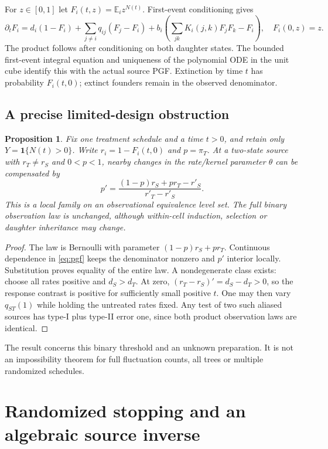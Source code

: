 \documentclass[11pt]{article}
\newtheorem{proposition}[theorem]{Proposition}
\theoremstyle{definition}
\newcommand{\E}{\mathbb E}
\begin{document}
For $z\in[0,1]$ let $F_i(t,z)=\E_i z^{N(t)}$. First-event conditioning gives
\begin{equation}\label{eq:pgf}
 \partial_tF_i=d_i(1-F_i)+\sum_{j\ne i}q_{ij}(F_j-F_i)
       +b_i\left(\sum_{jk}K_i(j,k)F_jF_k-F_i\right),\quad F_i(0,z)=z.
\end{equation}
The product follows after conditioning on both daughter states. The bounded
first-event integral equation and uniqueness of the polynomial ODE in the unit
cube identify this with the actual source PGF. Extinction by time $t$ has
probability $F_i(t,0)$; extinct founders remain in the observed denominator.

\subsection{A precise limited-design obstruction}
\begin{proposition}\label{prop:alias}
Fix one treatment schedule and a time $t>0$, and retain only
$Y=\mathbf1\{N(t)>0\}$. Write $r_i=1-F_i(t,0)$ and $p=\pi_T$. At a two-state
source with $r_T\ne r_S$ and $0<p<1$, nearby changes in the rate/kernel
parameter $\theta$ can be compensated by
\begin{equation}\label{eq:alias}
 p'=\frac{(1-p)r_S+pr_T-r'_S}{r'_T-r'_S}.
\end{equation}
This is a local family on an observational equivalence level set. The full
binary observation law is unchanged, although within-cell induction, selection
or daughter inheritance may change.
\end{proposition}
\begin{proof}
The law is Bernoulli with parameter $(1-p)r_S+pr_T$. Continuous dependence in
\eqref{eq:pgf} keeps the denominator nonzero and $p'$ interior locally.
Substitution proves equality of the entire law. A nondegenerate class exists:
choose all rates positive and $d_S>d_T$. At zero, $(r_T-r_S)'=d_S-d_T>0$, so the
response contrast is positive for sufficiently small positive $t$. One may then
vary $q_{ST}(1)$ while holding the untreated rates fixed. Any test of two such
aliased sources has type-I plus type-II error one, since both product
observation laws are identical.
\end{proof}
The result concerns this binary threshold and an unknown preparation. It is not
an impossibility theorem for full fluctuation counts, all trees or multiple
randomized schedules.

\section{Randomized stopping and an algebraic source inverse}
\end{document}
